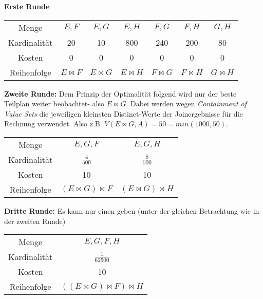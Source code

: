 \documentclass[12pt]{article}
\begin{document}
\textbf{Erste Runde}

\begin{center}
\begin{tabular}{c|c|c|c|c|c|c}
    Menge & ${E,F}$ & ${E,G}$ & ${E,H}$ & ${F,G}$ & ${F,H}$ & ${G,H}$\\
    Kardinalität & 20 & 10 & 800 & 240 & 200 & 80\\
    Kosten & 0 & 0 & 0 & 0 & 0 & 0\\
    Reihenfolge & $E\bowtie F$ & $E\bowtie G$ & $E\bowtie H$ & $F\bowtie G$ & $F\bowtie H$ & $G\bowtie H$\\
\end{tabular}
\end{center}

\textbf{Zweite Runde:} Dem Prinzip der Optimalität folgend wird nur der beste Teilplan weiter beobachtet- also $E \bowtie G$.
Dabei werden wegen \textit{Containment of Value Sets} die jeweiligen kleinsten Distinct-Werte der Joinergebnisse für die Rechnung verwendet. Also z.B. $V(E \bowtie G, A) = 50 = min(1000,50)$.
\begin{center}
\begin{tabular}{c|c|c}
    Menge & ${E,G,F}$ & ${E,G,H}$\\
    Kardinalität & $\frac{4}{500}$ & $\frac{8}{500}$ \\
    Kosten & 10 & 10\\
    Reihenfolge & $(E\bowtie G)\bowtie F$ & $(E\bowtie G)\bowtie H$\\
\end{tabular}
\end{center}

\textbf{Dritte Runde:}  Es kann nur einen geben (unter der gleichen Betrachtung wie in der zweiten Runde)
\begin{center}
\begin{tabular}{c|c}
    Menge & ${E,G,F,H}$ \\
    Kardinalität & $\frac{1}{62500}$ \\
    Kosten & 10 \\
    Reihenfolge & $((E\bowtie G)\bowtie F) \bowtie H$ \\
\end{tabular}
\end{center}
\end{document}
